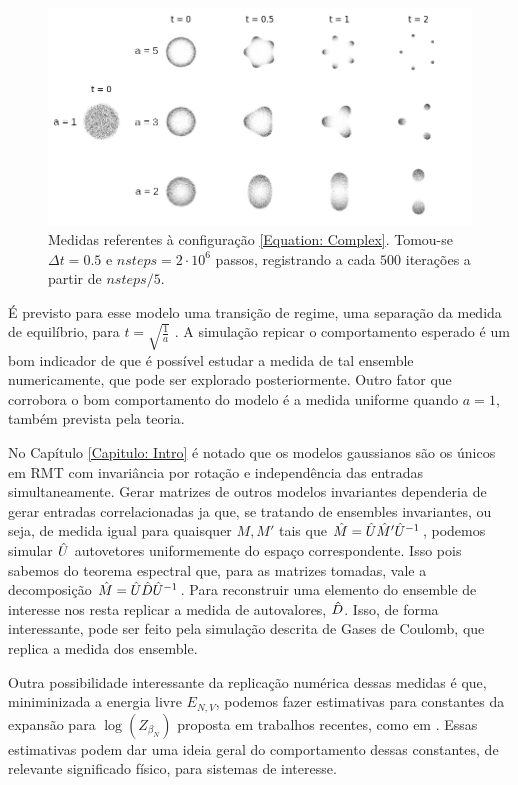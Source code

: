 \begin{figure}[ht]
	\centering
	\includegraphics[width=\textwidth]{Assets/complexPotential.png}
	\caption{Medidas referentes à configuração \ref{Equation: Complex}. Tomou-se $\Delta t = 0.5$ e $nsteps = 2\cdot10^6$ passos, registrando a cada $500$ iterações a partir de $nsteps/5$.}
	\label{Figura: Complex}
\end{figure}

É previsto para esse modelo uma transição de regime, uma separação da medida de equilíbrio, para $t = \sqrt{\frac{1}{a}}$ \cite{nao sei ainda}. A simulação repicar o comportamento esperado é um bom indicador de que é possível estudar a medida de tal ensemble numericamente, que pode ser explorado posteriormente. Outro fator que corrobora o bom comportamento do modelo é a medida uniforme quando $a=1$, também prevista pela teoria. 

No Capítulo \ref{Capitulo: Intro} é notado que os modelos gaussianos são os únicos em RMT com invariância por rotação e independência das entradas simultaneamente. Gerar matrizes de outros modelos invariantes dependeria de gerar entradas correlacionadas ja que, se tratando de ensembles invariantes, ou seja, de medida igual para quaisquer $M, M'$ tais que $\hat M = \hat U \hat M' \hat U^{-1}$, podemos simular $\hat U$ autovetores uniformemente do espaço correspondente. Isso pois sabemos do teorema espectral que, para as matrizes tomadas, vale a decomposição $\hat M = \hat U \hat D \hat U^{-1}$. Para reconstruir uma elemento do ensemble de interesse nos resta replicar a medida de autovalores, $\hat D$. Isso, de forma interessante, pode ser feito pela simulação descrita de Gases de Coulomb, que replica a medida dos ensemble.

Outra possibilidade interessante da replicação numérica dessas medidas é que, miniminizada a energia livre $E_{N, V}$, podemos fazer estimativas para constantes da expansão para $\log(Z_{\beta_N})$ proposta em trabalhos recentes, como em \cite{Byun_2023}. Essas estimativas podem dar uma ideia geral do comportamento dessas constantes, de relevante significado físico, para sistemas de interesse.  
